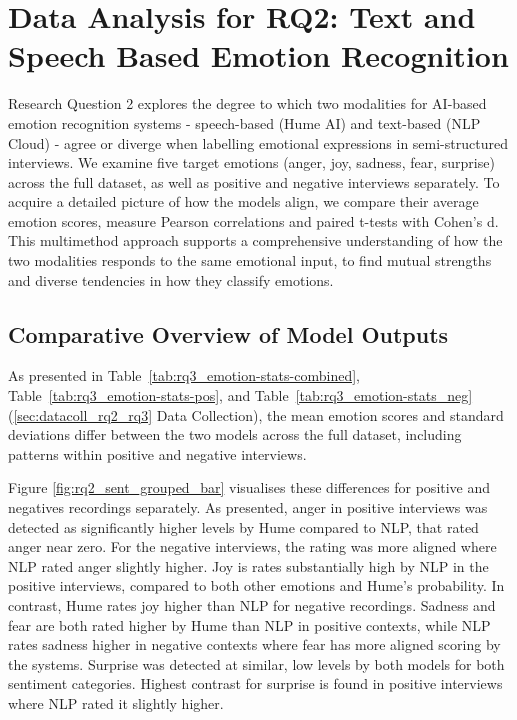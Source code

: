 \section{Data Analysis for RQ2: Text and Speech Based Emotion Recognition}
Research Question 2 explores the degree to which two modalities for AI-based emotion recognition systems - speech-based (Hume AI) and text-based (NLP Cloud) - agree or diverge when labelling emotional expressions in semi-structured interviews. 
We examine five target emotions (anger, joy, sadness, fear, surprise) across the full dataset, as well as positive and negative interviews separately. To acquire a detailed picture of how the models align, we compare their average emotion scores, 
measure Pearson correlations and paired t-tests with Cohen’s d. This multimethod approach supports a comprehensive understanding of how the two modalities responds to the same emotional input, to find mutual strengths and diverse tendencies in how they classify emotions. 
\subsection{Comparative Overview of Model Outputs}

As presented in Table~\ref{tab:rq3_emotion-stats-combined}, Table~\ref{tab:rq3_emotion-stats-pos}, and Table~\ref{tab:rq3_emotion-stats_neg} (\ref{sec:datacoll_rq2_rq3} Data Collection),
the mean emotion scores and standard deviations differ between the two models across the full dataset,
including patterns within positive and negative interviews. 

Figure \ref{fig:rq2_sent_grouped_bar} visualises these differences for positive and negatives recordings separately. As presented, anger in positive interviews was detected as significantly higher levels by Hume compared to NLP, 
that rated anger near zero. For the negative interviews, the rating was more aligned where NLP rated anger slightly higher. Joy is rates substantially high by NLP in the positive interviews, compared to both other emotions and Hume’s probability. 
In contrast, Hume rates joy higher than NLP for negative recordings. Sadness and fear are both rated higher by Hume than NLP in positive contexts, while NLP rates sadness higher in negative contexts where fear has more aligned scoring by the systems. 
Surprise was detected at similar, low levels by both models for both sentiment categories. 
Highest contrast for surprise is found in positive interviews where NLP rated it slightly higher.  

